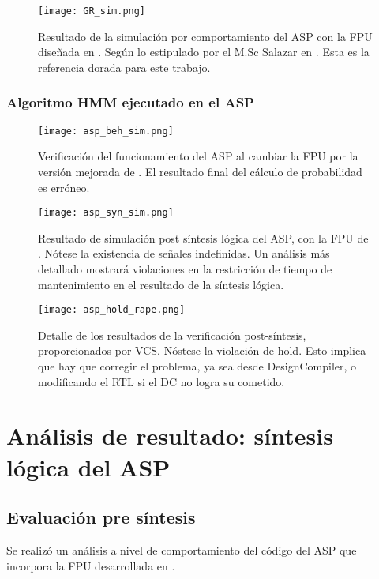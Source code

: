 \begin{figure}[ht]
\texttt{[image: GR\_sim.png]}
\centering
\caption{Resultado de la simulación por comportamiento del ASP con la FPU diseñada en \cite{Diego2015}. Según lo estipulado por el M.Sc Salazar en \cite{Carlosthesis}. Esta es la referencia dorada para este trabajo.}
\label{fig:gr_sim}
\end{figure}

\subsubsection{Algoritmo HMM ejecutado en el ASP}
\begin{figure}[h]
\texttt{[image: asp\_beh\_sim.png]}
\centering
\caption{Verificación del funcionamiento del ASP al cambiar la FPU por la versión mejorada de \cite{Francis2016, concapan}. El resultado final del cálculo de probabilidad es erróneo.}
\label{fig:asp_beh_sim}
\end{figure}

\begin{figure}[h]
\texttt{[image: asp\_syn\_sim.png]}
\centering
\caption{Resultado de simulación post síntesis lógica del ASP, con la FPU de \cite{Francis2016, concapan}. Nótese la existencia de señales indefinidas. Un análisis más detallado mostrará violaciones en la restricción de tiempo de mantenimiento en el resultado de la síntesis lógica.}
\label{fig:asp_syn_sim}
\end{figure}

\begin{figure}[h]
\texttt{[image: asp\_hold\_rape.png]}
\caption{Detalle de los resultados de la verificación post-síntesis, proporcionados por VCS. Nóstese la violación de hold. Esto implica que hay que corregir el problema, ya sea desde DesignCompiler, o modificando el RTL si el DC no logra su cometido.}
\label{fig_asp_hold}
\end{figure}

\section{Análisis de resultado: síntesis lógica del ASP}

\subsection{Evaluación pre síntesis}

Se realizó un análisis a nivel de comportamiento del código del ASP que incorpora la FPU desarrollada en \cite{Diego2015}.

